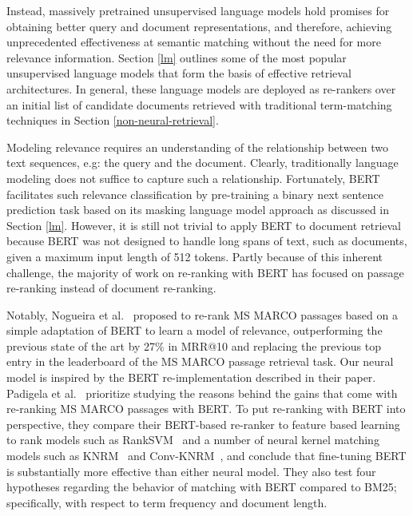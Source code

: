 Instead, massively pretrained unsupervised language models hold promises for obtaining better query and document representations, and therefore, achieving unprecedented effectiveness at semantic matching without the need for more relevance information.
Section \ref{lm} outlines some of the most popular unsupervised language models that form the basis of effective retrieval architectures.
In general, these language models are deployed as re-rankers over an initial list of candidate documents retrieved with traditional term-matching techniques in Section \ref{non-neural-retrieval}.

Modeling relevance requires an understanding of the relationship between two text sequences, e.g: the query and the document.
Clearly, traditionally language modeling does not suffice to capture such a relationship.
Fortunately, BERT facilitates such relevance classification by pre-training a binary next sentence prediction task based on its masking language model approach as discussed in Section \ref{lm}.
However, it is still not trivial to apply BERT to document retrieval because BERT was not designed to handle long spans of text, such as documents, given a maximum input length of 512 tokens.
Partly because of this inherent challenge, the majority of work on re-ranking with BERT has focused on 
passage re-ranking instead of document re-ranking.

Notably, Nogueira et al.~\cite{nogueira2019passage} proposed to re-rank MS MARCO passages based on a simple adaptation of BERT to learn a model of relevance, outperforming the previous state of the art by 27\% in MRR@10 and replacing the previous top entry in the leaderboard of the MS MARCO passage retrieval task.
Our neural model is inspired by the BERT re-implementation described in their paper.
Padigela et al.~\cite{Padigela:1905.01758:2019} prioritize studying the reasons behind the gains that come with re-ranking MS MARCO passages with BERT.
To put re-ranking with BERT into perspective, they compare their BERT-based re-ranker to feature based learning to rank models such as RankSVM~\cite{joachims2002optimizing} and a number of neural kernel matching models such as KNRM~\cite{xiong2017knrm} and Conv-KNRM~\cite{dai2018convolutional}, and conclude that  fine-tuning BERT is substantially more effective than either neural model.
They also test four hypotheses regarding the behavior of matching with BERT compared to BM25; specifically, with respect to term frequency and document length.


